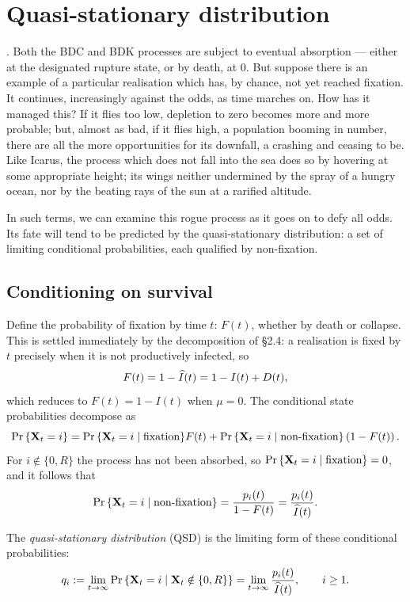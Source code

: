 \section{Quasi-stationary distribution}
\label{sec:qsd}

\cite{van2011quasi}. Both the BDC and BDK processes are subject to eventual
absorption --- either at the designated rupture state, or by death, at $0$.
But suppose there is an example of a particular realisation which has, by
chance, not yet reached fixation. It continues, increasingly against the
odds, as time marches on. How has it managed this? If it flies too low,
depletion to zero becomes more and more probable; but, almost as bad, if it
flies high, a population booming in number, there are all the more
opportunities for its downfall, a crashing and ceasing to be.
Like Icarus, the process which does not fall into the sea does so by
hovering at some appropriate height; its wings neither undermined by the
spray of a hungry ocean, nor by the beating rays of the sun at a rarified
altitude. \par
In such terms, we can examine this rogue process as it goes on to defy all
odds. Its fate will tend to be predicted by the quasi-stationary
distribution: a set of limiting conditional probabilities, each qualified by
non-fixation. \par

\subsection{Conditioning on survival}

Define the probability of fixation by time $t$: $F(t)$, whether by death or
collapse. This is settled immediately by the decomposition of \S2.4: a
realisation is fixed by $t$ precisely when it is not productively infected,
so
\begin{equation}
F(t)=1-\widehat{I}(t)=1-I(t)+D(t),
\end{equation}
which reduces to $F(t)=1-I(t)$ when $\mu=0$. The conditional state
probabilities decompose as
$${\text{Pr}\left\{{{\bf X}_t} = i\right\}} = {\text{Pr}\left\{{{\bf X}_t}=i\mid \text{fixation}\right\}}F(t) + {\text{Pr}\left\{{{\bf X}_t}=i\mid \text{non-fixation}\right\}} \left(1-F(t)\right).$$
For $i\notin\{0,R\}$ the process has not been absorbed, so
${\text{Pr}\left\{{{\bf X}_t}=i\mid\text{fixation}\right\}}=0$, and it follows that
\begin{equation}
{\text{Pr}\left\{{{\bf X}_t}=i\mid \text{non-fixation}\right\}} = \frac{p_i(t)}{1-F(t)}=\frac{p_i(t)}{\widehat{I}(t)}.
\label{eq:condp}
\end{equation}

The \emph{quasi-stationary distribution} (QSD) is the limiting form of these
conditional probabilities:
\begin{equation}
q_i:=\lim_{t\to\infty}{\text{Pr}\left\{{{\bf X}_t}=i\mid{{\bf X}_t}\notin\{0,R\}\right\}}
=\lim_{t\to\infty}\frac{p_i(t)}{\widehat{I}(t)},\qquad i\ge1.
\end{equation}

